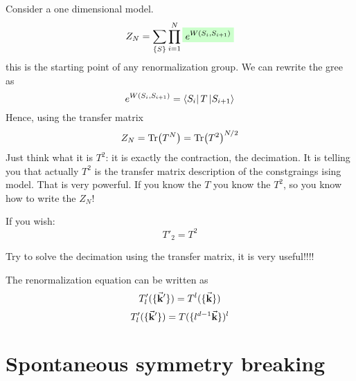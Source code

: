 \documentclass[../main/main.tex]{subfiles}
\begin{document}
\section{}
Consider a one dimensional model.
\begin{equation}
  Z_N = \sum_{\{ S  \}  }^{} \prod_{i=1}^{N} \mathcolorbox{green!20}{ e^{W (S_i, S_{i+1})} }
\end{equation}
this is the starting point of any renormalization group.
We can rewrite the gree as
\begin{equation}
  e^{W (S_i, S_{i+1})} = \bra{S_i} T \ket{S_{i+1}}
\end{equation}
Hence, using the transfer matrix
\begin{equation}
  Z_N = \Tr (T^N) = \Tr(T^2)^{N/2}
\end{equation}
Just think what it is \( T^2 \): it is exactly the contraction, the decimation. It is telling you that actually \( T^2 \) is the transfer matrix description of the constgraings ising model. That is very powerful. If you know the \( T \) you know the \( T^2 \), so you know how to write the \( Z_N \)!

If you wish:
\begin{equation}
  T'_2 = T^2
\end{equation}

Try to solve the decimation using the transfer matrix, it is very useful!!!!

The renormalization equation can be written as
\begin{equation}
  T_l' ( \{ \va{k}' \}  ) = T^l ( \{ \va{k} \}  )
\end{equation}
\begin{equation}
  T_l' ( \{ \va{k}' \}  ) = T ( \{ l^{d-1} \va{k} \}  )^l
\end{equation}






\section{Spontaneous symmetry breaking}
\end{document}
